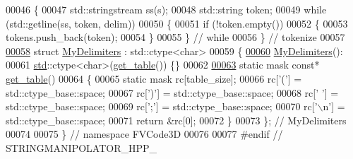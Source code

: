 \begin{DoxyCode}
00046 \{
00047     std::stringstream ss(s);
00048     std::string token;
00049     \textcolor{keywordflow}{while} (std::getline(ss, token, delim))
00050     \{
00051         \textcolor{keywordflow}{if} (!token.empty())
00052         \{
00053             tokens.push\_back(token);
00054         \}
00055     \} \textcolor{comment}{// while}
00056 \} \textcolor{comment}{// tokenize}
00057 
\hypertarget{StringManipolator_8hpp_source.tex_l00058}{}\hyperlink{structFVCode3D_1_1MyDelimiters}{00058} \textcolor{keyword}{struct }\hyperlink{structFVCode3D_1_1MyDelimiters}{MyDelimiters} : std::ctype<char>
00059 \{
\hypertarget{StringManipolator_8hpp_source.tex_l00060}{}\hyperlink{structFVCode3D_1_1MyDelimiters_adb7e5521ba8b5e71c6a3761bfcf772dc}{00060}     \hyperlink{structFVCode3D_1_1MyDelimiters_adb7e5521ba8b5e71c6a3761bfcf772dc}{MyDelimiters}():
00061         \hyperlink{namespacestd}{std}::ctype<char>(\hyperlink{structFVCode3D_1_1MyDelimiters_a9fe12c8425c905cecf5c5c4b6e80c630}{get\_table}()) \{\}
00062 
\hypertarget{StringManipolator_8hpp_source.tex_l00063}{}\hyperlink{structFVCode3D_1_1MyDelimiters_a9fe12c8425c905cecf5c5c4b6e80c630}{00063}     \textcolor{keyword}{static} mask \textcolor{keyword}{const}* \hyperlink{structFVCode3D_1_1MyDelimiters_a9fe12c8425c905cecf5c5c4b6e80c630}{get\_table}()
00064     \{
00065         \textcolor{keyword}{static} mask rc[table\_size];
00066         rc[\textcolor{charliteral}{'('}] = std::ctype\_base::space;
00067         rc[\textcolor{charliteral}{')'}] = std::ctype\_base::space;
00068         rc[\textcolor{charliteral}{' '}] = std::ctype\_base::space;
00069         rc[\textcolor{charliteral}{';'}] = std::ctype\_base::space;
00070         rc[\textcolor{charliteral}{'\(\backslash\)n'}] = std::ctype\_base::space;
00071         \textcolor{keywordflow}{return} &rc[0];
00072     \}
00073 \}; \textcolor{comment}{// MyDelimiters}
00074 
00075 \} \textcolor{comment}{// namespace FVCode3D}
00076 
00077 \textcolor{preprocessor}{#endif // STRINGMANIPOLATOR\_HPP\_}
\end{DoxyCode}
